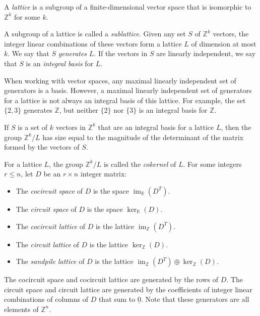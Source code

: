 \documentclass[ALCO,ThmDefs,Unicode,epreuves]{cedram}
\newcommand{\un}{\underline}
\newcommand{\R}{\mathbb{R}}
\newcommand{\Z}{\mathbb{Z}}
\DeclareMathOperator{\Ima}{im}
\begin{document}
\begin{defi}
A \emph{lattice} is a subgroup of a finite-dimensional vector space that is isomorphic to $\Z^k$ for some $k$.
\end{defi}

A subgroup of a lattice is called a \emph{sublattice}. Given any set $S$ of $\Z^k$ vectors, the integer linear combinations of these vectors form a lattice $L$ of dimension at most $k$. We say that $S$ \emph{generates} $L$. If the vectors in $S$ are linearly independent, we say that $S$ is an \emph{integral basis} for $L$. 

\begin{rema} When working with vector spaces, any maximal linearly independent set of generators is a basis. However, a maximal linearly independent set of generators for a lattice is not always an integral basis of this lattice. For example, the set $\{2,3\}$ generates $\Z$, but neither $\{2\}$ nor $\{3\}$ is an integral basis for $\Z$. 
\end{rema}

\begin{prop}\label{cokersize}
If $S$ is a set of $k$ vectors in $\Z^k$ that are an integral basis for a lattice $L$, then the group $\Z^k/ L$ has size equal to the magnitude of the determinant of the matrix formed by the vectors of $S$.
\end{prop}

For a lattice $L$, the group $\Z^k / L$ is called the \emph{cokernel} of $L$. For some integers $r \le n$, let $D$ be an $r \times n$ integer matrix:

\begin{defi}\label{def:cutandflow}\hfill
\begin{itemize}
\item The \emph{cocircuit space} of $D$ is the space $\Ima_\R(D^T)$.
\item The \emph{circuit space} of $D$ is the space $\ker_\R(D)$.
\item The \emph{cocircuit lattice} of $D$ is the lattice $\Ima_\Z(D^T)$.
\item The \emph{circuit lattice} of $D$ is the lattice $\ker_\Z(D)$.
\item The \emph{sandpile lattice} of $D$ is the lattice $\Ima_\Z(D^T) \oplus \ker_\Z(D)$.
\end{itemize}
\end{defi}

The cocircuit space and cocircuit lattice are generated by the rows of $D$. The circuit space and circuit lattice are generated by the coefficients of integer linear combinations of columns of $D$ that sum to $\un 0$. Note that these generators are all elements of $\Z^n$.
\end{document}
